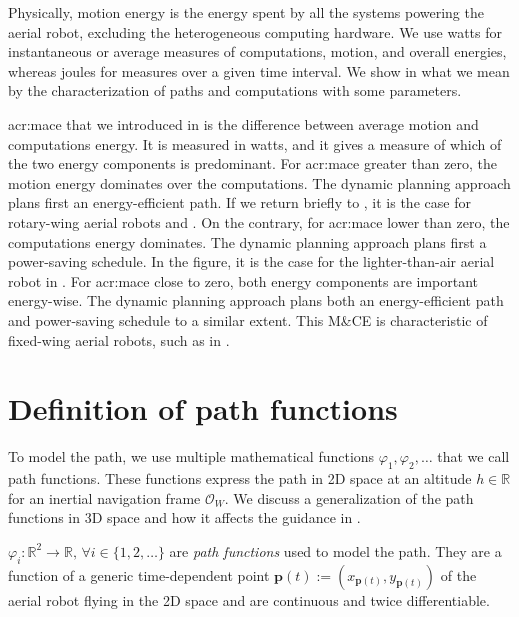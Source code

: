 Physically, motion energy is the energy spent by all the systems powering the aerial robot, excluding the heterogeneous computing hardware. We use watts for instantaneous or average measures of computations, motion, and overall energies, whereas joules for measures over a given time interval. We show in  what we mean by the characterization of paths and computations with some parameters.

\Gls{acr:mace} that we introduced in  is the difference between average motion and computations energy. It is measured in watts, and it gives a measure of which of the two energy components is predominant. For \Gls{acr:mace} greater than zero, the motion energy dominates over the computations. The dynamic planning approach plans first an energy-efficient path. If we return briefly to , it is the case for rotary-wing aerial robots  and . On the contrary, for \Gls{acr:mace} lower than zero, the computations energy dominates. The dynamic planning approach plans first a power-saving schedule. In the figure, it is the case for the lighter-than-air aerial robot  in . For \Gls{acr:mace} close to zero, both energy components are important energy-wise. The dynamic planning approach plans both an energy-efficient path and power-saving schedule to a similar extent. This M\&CE is characteristic of fixed-wing aerial robots, such as  in .


\section{Definition of path functions}
\label{sec:path-functions}

To model the path, we use multiple mathematical functions $\varphi_1,\varphi_2,\dots$ that we call path functions. These functions express the path in 2D space at an altitude $h\in\mathbb{R}$ for an inertial navigation frame $\mathcal{O}_W$. We discuss a generalization of the path functions in 3D space and how it affects the guidance in . 

\begin{highlight}
  \begin{defn}\label{def:paths}
    $\varphi_i:\mathbb{R}^2\rightarrow\mathbb{R},\,\forall i\in\{1,2,\dots\}$ are \emph{path functions} used to model the path. They are a function of a generic time-dependent point $\mathbf{p}(t):=(x_{\mathbf{p}(t)},y_{\mathbf{p}(t)})$ of the aerial robot flying in the 2D space and are continuous and twice differentiable. 
  \end{defn}
\end{highlight}

